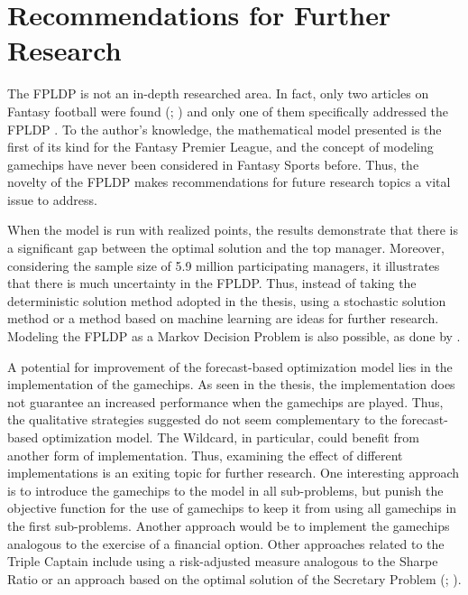 
\chapter{Recommendations for Further Research}

The FPLDP is not an in-depth researched area. In fact, only two articles on Fantasy football were found (\cite{Matthews}; \cite{Bonomo}) and only one of them specifically addressed the FPLDP \citep{Matthews}. To the author's knowledge, the mathematical model presented is the first of its kind for the Fantasy Premier League, and the concept of modeling gamechips have never been considered in Fantasy Sports before. Thus, the novelty of the FPLDP makes recommendations for future research topics a vital issue to address.

\newpar

When the model is run with realized points, the results demonstrate that there is a significant gap between the optimal solution and the top manager. Moreover, considering the sample size of 5.9 million participating managers, it illustrates that there is much uncertainty in the FPLDP. Thus, instead of taking the deterministic solution method adopted in the thesis, using a stochastic solution method or a method based on machine learning are ideas for further research. Modeling the FPLDP as a Markov Decision Problem is also possible, as done by \cite{Matthews}.

\newpar

A potential for improvement of the forecast-based optimization model lies in the implementation of the gamechips. As seen in the thesis, the implementation does not guarantee an increased performance when the gamechips are played. Thus, the qualitative strategies suggested do not seem complementary to the forecast-based optimization model. The Wildcard, in particular, could benefit from another form of implementation. Thus, examining the effect of different implementations is an exiting topic for further research. One interesting approach is to introduce the gamechips to the model in all sub-problems, but punish the objective function for the use of gamechips to keep it from using all gamechips in the first sub-problems. Another approach would be to implement the gamechips analogous to the exercise of a financial option. Other approaches related to the Triple Captain include using a risk-adjusted measure analogous to the Sharpe Ratio \citep{Sharpe} or an approach based on the optimal solution of the Secretary Problem (\cite{Lindley}; \cite{Bruss}).


